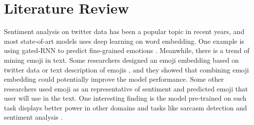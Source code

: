 \documentclass{proc}
\begin{document}
\section{Literature Review}

Sentiment analysis on twitter data has been a popular topic in recent years, and most state-of-art models uses deep learning on word embedding. One example is using gated-RNN to predict fine-grained emotions \cite{abdul2017emonet}. Meanwhile, there is a trend of mining emoji in text. Some researchers designed an emoji embedding based on twitter data \cite{barbieri2016does} or text description of emojis \cite{eisner2016emoji2vec}, and they showed that combining emoji embedding could potentially improve the model performance. Some other researchers used emoji as an representative of sentiment and predicted emoji that user will use in the text. One interesting finding is the model pre-trained on such task displays better power in other domains and tasks like sarcasm detection and sentiment analysis \cite{felbo2017using}. 



\end{document}
